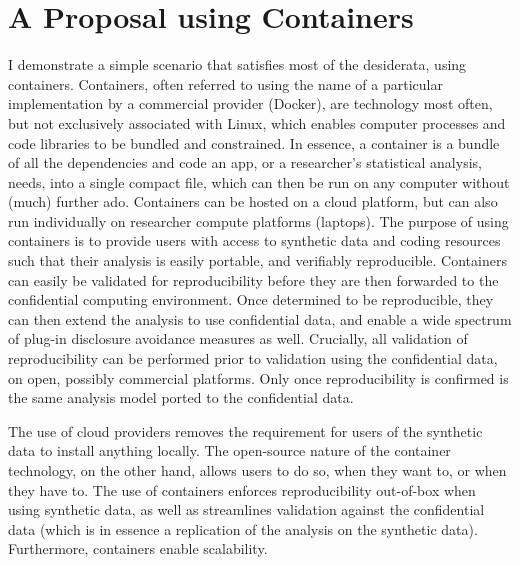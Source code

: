\documentclass{article}
\begin{document}
\section{A Proposal using Containers}
\label{sec:proposal}
I demonstrate a simple scenario that satisfies most of the desiderata,  using containers. Containers, often referred to using the name of a particular implementation by a commercial provider (Docker), are technology most often, but not exclusively associated with Linux, which enables computer processes and code libraries to be bundled and constrained. In essence, a container is a bundle of all the dependencies and code an app, or a researcher's statistical analysis, needs, into a single compact file, which can then be run on any computer without (much) further ado. Containers can be hosted on a cloud platform, but can also run individually on researcher compute platforms (laptops).  The purpose of using containers is to provide users with access to synthetic data and coding resources such that their analysis is easily portable, and verifiably reproducible. Containers can easily be validated for reproducibility before they are then forwarded to the confidential computing environment. Once determined to be reproducible, they can then extend the analysis to use confidential data, and enable a wide spectrum of plug-in disclosure avoidance measures as well. Crucially, all validation of reproducibility can be performed prior to validation using the confidential data, on open, possibly commercial platforms. Only once reproducibility is confirmed is the same analysis model ported to the confidential data. 

The use of cloud providers removes the requirement for users of the synthetic data to install anything locally. The open-source nature of the container technology, on the other hand, allows users to do so, when they want to, or when they have to. The use of containers enforces reproducibility out-of-box when using synthetic data, as well as streamlines validation against the confidential data (which is in essence a replication of the analysis on the synthetic data). Furthermore, containers enable scalability. 
\end{document}
